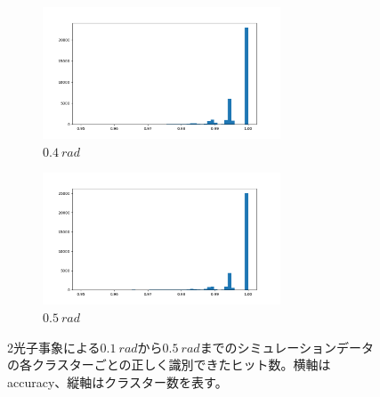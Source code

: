 \begin{figure}[H]
\begin{subfigure}{.5\textwidth}
\begin{center}
		\end{center}
	\end{subfigure}
		\begin{subfigure}{.5\textwidth}
		\begin{center}
			\includegraphics[width=200pt]{./Figure/DLAnalysis/rate_pred_4.png}%
			\caption{$\SI{0.4}{rad}$}
			\label{fig:sfig2}
		\end{center}
	\end{subfigure}
	\begin{subfigure}{.5\textwidth}
		\begin{center}
			\includegraphics[width=200pt]{./Figure/DLAnalysis/rate_pred_5.png}%
			\caption{$\SI{0.5}{rad}$}
			\label{fig:sfig2}
		\end{center}
	\end{subfigure}

	\caption[2光子事象による$\SI{0.1}{rad}$から$\SI{0.5}{rad}$までのシミュレーションデータの各クラスターごとの正しく識別できたヒット数]{2光子事象による$\SI{0.1}{rad}$から$\SI{0.5}{rad}$までのシミュレーションデータの各クラスターごとの正しく識別できたヒット数。横軸はaccuracy、縦軸はクラスター数を表す。}
	\label{result_DoublePG}
\end{figure}

